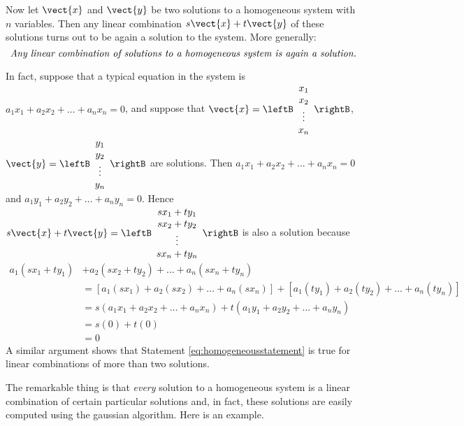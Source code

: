 Now let $\vect{x}$ and $\vect{y}$ be two solutions to a homogeneous system with $n$ variables. Then any linear combination $s\vect{x} + t\vect{y}$ of these solutions turns out to be again a solution to the system. More generally:
\begin{equation}\label{eq:homogeneousstatement}
\mbox{ \textit{Any linear combination of solutions to a homogeneous system is again a solution.}}
\end{equation}

In fact, suppose that a typical equation in the system is $a_1x_1 + a_2x_2 + \dots + a_nx_n = 0$, and suppose that \newline $\vect{x} = 
\leftB \begin{array}{c}
	x_1 \\
	x_2 \\
	\vdots \\
	x_n
\end{array} \rightB$, $ \vect{y} = 
\leftB \begin{array}{c}
	y_1 \\
	y_2 \\
	\vdots \\
	y_n
\end{array} \rightB$ are solutions. Then $a_1x_1 + a_2x_2 + \dots + a_nx_n = 0$ and
$a_1y_1 + a_2y_2 + \dots + a_ny_n = 0$.
Hence $s\vect{x} + t\vect{y} =
	\leftB \begin{array}{c}
		sx_1 + ty_1 \\
		sx_2 + ty_2 \\
		\vdots \\
		sx_n + ty_n
	\end{array} \rightB$ is also a solution because
\begin{align*}
a_1(sx_1 + ty_1) &+ a_2(sx_2 + ty_2) + \dots + a_n(sx_n + ty_n) \\
 &= [a_1(sx_1) + a_2(sx_2) + \dots + a_n(sx_n)] + [a_1(ty_1) + a_2(ty_2) + \dots + a_n(ty_n)] \\
 &= s(a_1x_1 + a_2x_2 + \dots + a_nx_n) + t(a_1y_1 + a_2y_2 + \dots + a_ny_n) \\
 &= s(0) + t(0)\\
 &= 0
\end{align*}
A similar argument shows that Statement \ref{eq:homogeneousstatement} is true for linear combinations of more than two solutions.

The remarkable thing is that \textit{every} solution to a homogeneous system is a linear combination of certain particular solutions and, in fact, these solutions are easily computed using the gaussian algorithm. Here is an example.

